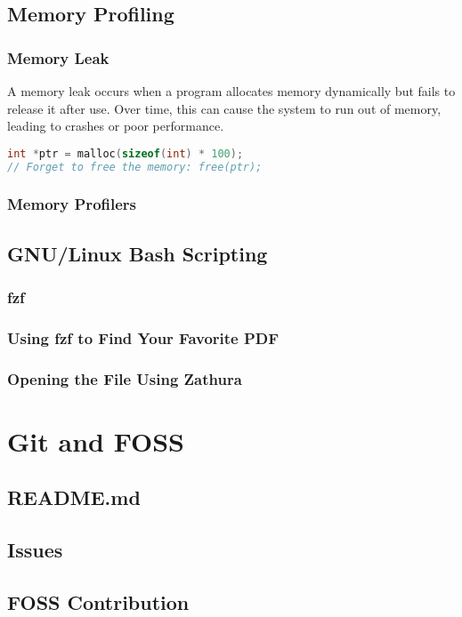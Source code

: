 \documentclass{article}
\begin{document}
\subsection{Memory Profiling}

\subsubsection{Memory Leak}
A memory leak occurs when a program allocates memory dynamically but fails to release it after use. Over time, this can cause the system to run out of memory, leading to crashes or poor performance.
\begin{lstlisting}[language=C]
int *ptr = malloc(sizeof(int) * 100);
// Forget to free the memory: free(ptr);
\end{lstlisting}

\subsubsection{Memory Profilers}

\subsection{GNU/Linux Bash Scripting}

\subsubsection{fzf}

\subsubsection{Using fzf to Find Your Favorite PDF}

\subsubsection{Opening the File Using Zathura}

\section{Git and FOSS}
\subsection{README.md}

\subsection{Issues}

\subsection{FOSS Contribution}
\end{document}

